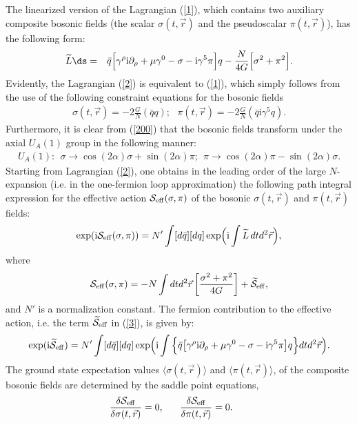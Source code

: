 \documentclass[12pt,a4paper]{article}
\begin{document}
The linearized version of the Lagrangian (\ref{1}), which contains two auxiliary
composite bosonic fields (the scalar $\sigma (t,\vec r)$ and the pseudoscalar $\pi (t,\vec r)$),
has the following form:
\begin{eqnarray}
\widetilde L\ds &=&\bar q\Big [\gamma^\rho\mathrm{i}\partial_\rho
+\mu\gamma^0-\sigma -\mathrm{i}\gamma^5\pi\Big ]q
 -\frac{N}{4G}\Big [\sigma^2+\pi^2\Big ].
\label{2}
\end{eqnarray}
Evidently, the Lagrangian (\ref{2}) is equivalent to (\ref{1}), which simply follows from the use of the
following constraint equations for the bosonic fields
\begin{eqnarray}
\sigma(t,\vec r)=-2\frac G{N}(\bar qq);~~~\pi (t,\vec r)=-2\frac G{N}(\bar q
\mathrm{i}\gamma^5 q). \label{200}
\end{eqnarray}
Furthermore, it is clear from (\ref{200}) that the bosonic fields transform under the axial $U_{A}(1)$ group in the following manner:
\begin{eqnarray}
U_{A}(1):~~\sigma \to\cos (2\alpha)\sigma +\sin (2\alpha)\pi;
~~\pi\to\cos (2\alpha)\pi-\sin (2\alpha)\sigma.
\label{201}
\end{eqnarray}
Starting from Lagrangian (\ref{2}), one obtains in the leading order
of the large $N$-expansion (i.e. in the one-fermion loop
approximation) the following path integral expression for the
effective action ${\cal S}_{\rm {eff}}(\sigma,\pi)$ of the bosonic
$\sigma (t,\vec r)$ and $\pi (t,\vec r)$ fields:
$$
\exp(\mathrm{i}{\cal S}_{\rm {eff}}(\sigma,\pi))=
  N'\int[d\bar q][dq]\exp\Bigl(\mathrm{i}\int\widetilde L\,dtd^2\vec r\Bigr),
$$
where
\begin{equation}
{\cal S}_{\rm {eff}}
(\sigma,\pi)
=-N\int dtd^2\vec r\left [\frac{\sigma^2+\pi^2}{4G}
\right ]+\widetilde {\cal S}_{\rm {eff}},
\label{3}
\end{equation}
and $N'$ is a normalization constant.
The fermion contribution to the effective action, i.e. the term
$\widetilde {\cal S}_{\rm {eff}}$ in (\ref{3}), is given by:
\begin{equation}
\exp(\mathrm{i}\widetilde {\cal S}_{\rm {eff}})=N'\int [d\bar
q][dq]\exp\Bigl(\mathrm{i}\int\Big\{\bar q\big
[\gamma^\rho\mathrm{i}\partial_\rho +\mu\gamma^0-\sigma -\mathrm{i}\gamma^5\pi\big
]q\Big\}dtd^2\vec r\Bigr).
 \label{4}
\end{equation}
The ground state expectation values  $\langle\sigma(t,\vec r)\rangle$ and
$\langle\pi(t,\vec r)\rangle$, of the composite bosonic fields are determined by
the saddle point equations,
\begin{eqnarray}
\frac{\delta {\cal S}_{\rm {eff}}}{\delta\sigma (t,\vec r)}=0,~~~~~
\frac{\delta {\cal S}_{\rm {eff}}}{\delta\pi (t,\vec r)}=0.~~~~~
\label{5}
\end{eqnarray}
\end{document}
